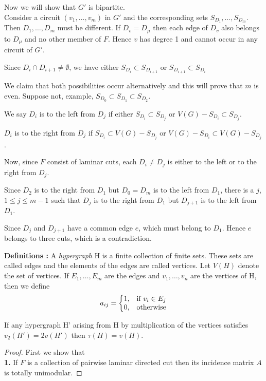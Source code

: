 \documentclass[8pt]{beamer}
\begin{document}
\begin{frame}

Now we will show that $G'$ is bipartite. \\
Consider a circuit $(v_1,\dots,v_m)$ in $G'$ and the corresponding sets $S_{D_1},\dots,S_{D_m}$.
Then $D_1,\dots,D_m$ must be different. If $D_v = D_\mu$ then each edge of $D_v$ also belongs to $D_\mu$ and no other member of $F$. Hence $v$ has degree 1 and cannot occur in any circuit of $G'$.

Since $D_i \cap D_{i+1} \ne \emptyset$, we have either $S_{D_i}\subset S_{D_{i+1}}$ or $S_{D_{i+1}}\subset S_{D_i}$

We claim that both possibilities occur alternatively and this will prove that $m$ is even. Suppose not, example, $S_{D_0} \subset S_{D_1}\subset S_{D_2}$. 

We say $D_i$ is to the left from $D_j$ if either $S_{D_i}\subset S_{D_j}$ or $V(G)-S_{D_i}\subset S_{D_j}$. 

$D_i$ is to the right from $D_j$ if $S_{D_i}\subset V(G)-S_{D_j}$ or $V(G)-S_{D_i}\subset V(G)-S_{D_j}$. 

Now, since $F$ consist of laminar cuts, each $D_i\ne D_j$ is either to the left or to the right from $D_j$.

Since $D_2$ is to the right from $D_1$ but $D_0 = D_m$ is to the left from $D_1$, there is a $j$, $1\le j\le m-1$ such that $D_j$ is to the right from $D_1$ but $D_{j+1}$ is to the left from $D_1$.  
    
Since $D_j$ and $D_{j+1}$ have a common edge $e$, which must belong to $D_1$. Hence $e$ belongs to three cuts, which is a contradiction. 

\eofproof
\end{frame}

\begin{frame}

\textbf{Definitions : }
A \textit{hypergraph} H is a finite collection of finite sets. These sets are called edges and the elements of the edges are called vertices. Let $V(H)$ denote the set of vertices. If $E_1,\dots,E_m$ are the edges and $v_1,\dots,v_n$ are the vertices of H, then we define 
$$
    a_{ij}=\left\{
    \begin{array}{@{}ll@{}}
    1, & \text{if}\ v_i \in E_j \\
    0, & \text{otherwise}
    \end{array}\right.
$$

\begin{hypergraph}[Hypergraph]
If any hypergraph H' arising from H by multiplication of the vertices satisfies $v_2(H') = 2v(H')$ then $\tau(H) = v(H)$. 
\end{hypergraph}

\begin{proof}
First we show that\\
\textbf{1.} If $F$ is a collection of pairwise laminar directed cut then its incidence matrix $A$ is totally unimodular. 

\end{proof}
\end{frame}
\end{document}
